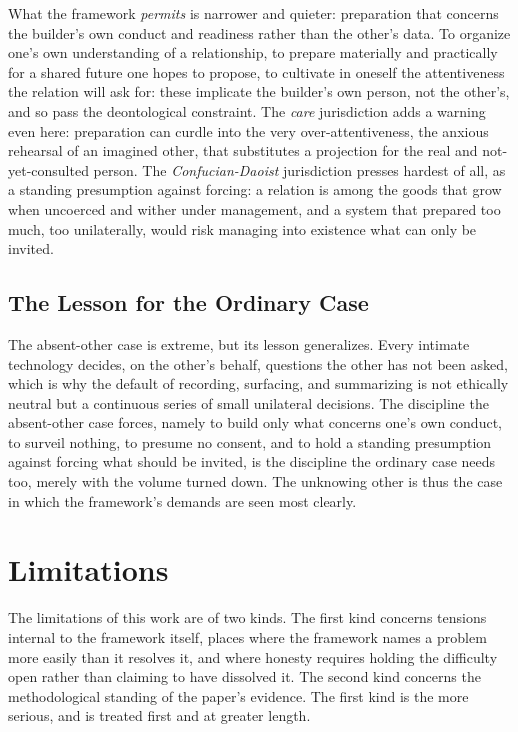What the framework \emph{permits} is narrower and quieter: preparation that concerns the builder's own conduct and readiness rather than the other's data. To organize one's own understanding of a relationship, to prepare materially and practically for a shared future one hopes to propose, to cultivate in oneself the attentiveness the relation will ask for: these implicate the builder's own person, not the other's, and so pass the deontological constraint. The \emph{care} jurisdiction adds a warning even here: preparation can curdle into the very over-attentiveness, the anxious rehearsal of an imagined other, that substitutes a projection for the real and not-yet-consulted person. The \emph{Confucian-Daoist} jurisdiction presses hardest of all, as a standing presumption against forcing: a relation is among the goods that grow when uncoerced and wither under management, and a system that prepared too much, too unilaterally, would risk managing into existence what can only be invited.

\subsection{The Lesson for the Ordinary Case}

The absent-other case is extreme, but its lesson generalizes. Every intimate technology decides, on the other's behalf, questions the other has not been asked, which is why the default of recording, surfacing, and summarizing is not ethically neutral but a continuous series of small unilateral decisions. The discipline the absent-other case forces, namely to build only what concerns one's own conduct, to surveil nothing, to presume no consent, and to hold a standing presumption against forcing what should be invited, is the discipline the ordinary case needs too, merely with the volume turned down. The unknowing other is thus the case in which the framework's demands are seen most clearly.

\section{Limitations}\label{p01:sec:limitations}

The limitations of this work are of two kinds. The first kind concerns tensions internal to the framework itself, places where the framework names a problem more easily than it resolves it, and where honesty requires holding the difficulty open rather than claiming to have dissolved it. The second kind concerns the methodological standing of the paper's evidence. The first kind is the more serious, and is treated first and at greater length.

